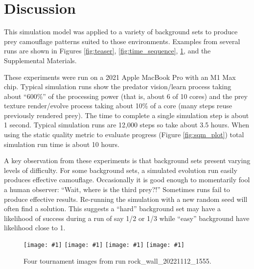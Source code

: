 \documentclass[letterpaper]{article}
\newcommand{\runID}{\footnotesize}
\newcommand{\igfour}[1]{\texttt{[image: \#1]}}
\begin{document}
\section{Discussion}
\label{sec:discussion}
This simulation model was applied to a variety of background sets to produce prey camouflage patterns suited to those environments. Examples from several runs are shown in Figures \ref{fig:teaser}, \ref{fig:time_sequence}, \ref{fig:rock_wall_4x}, and the Supplemental Materials.
\par
These experiments were run on a 2021 Apple MacBook Pro with an M1 Max chip. Typical simulation runs show the predator vision/learn process taking about “600\%” of the processing power (that is, about 6 of 10 cores) and the prey texture render/evolve process taking about 10\% of a core (many steps reuse previously rendered prey). The time to complete a single simulation step is about 1 second. Typical simulation runs are 12,000 steps so take about 3.5 hours. When using the static quality metric to evaluate progress (Figure \ref{fig:sqm_plot}) total simulation run time is about 10 hours.
\par
A key observation from these experiments is that background sets present varying levels of difficulty. For some background sets, a simulated evolution run easily produces effective camouflage. Occasionally it is good enough to momentarily fool a human observer: “Wait, where is the third prey?!” Sometimes runs fail to produce effective results. Re-running the simulation with a new random seed will often find a solution. This suggests a “hard” background set may have a likelihood of success during a run of say 1/2 or 1/3 while “easy” background have likelihood close to 1.
\par


\begin{figure}
    \igfour{20221112_1555_step_6495.png}
    \hfill
    \igfour{20221112_1555_step_5510.png}
    \hfill
    \igfour{20221112_1555_step_5681.png}
    \hfill
    \igfour{20221112_1555_step_6370.png}
    \caption{Four tournament images from run {\runID rock\_wall\_20221112\_1555}.}
    \label{fig:rock_wall_4x}
\end{figure}
\end{document}

